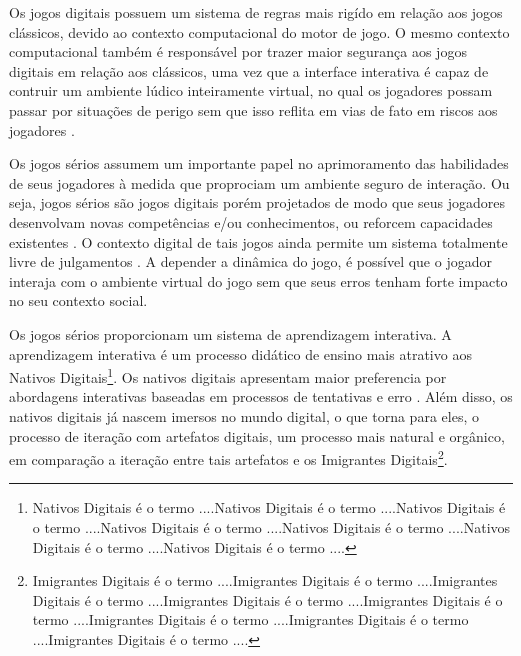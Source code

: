 \vspace{-0,1cm}

Os jogos digitais possuem um sistema de regras mais rigído em relação aos jogos clássicos, devido ao contexto computacional do motor de jogo. O mesmo contexto computacional também é responsável por trazer maior segurança aos jogos digitais em relação aos clássicos, uma vez que a interface interativa é capaz de contruir um ambiente lúdico inteiramente virtual, no qual os jogadores possam passar por situações de perigo sem que isso reflita em vias de fato em riscos aos jogadores \cite{lucchese2009conceituaccao}.



Os jogos sérios assumem um importante papel no aprimoramento das habilidades de seus jogadores à medida que proprociam um ambiente seguro de interação. Ou seja, jogos sérios são jogos digitais porém projetados de modo que seus jogadores desenvolvam novas competências e/ou conhecimentos, ou reforcem capacidades existentes \cite{boller2017play}. O contexto digital de tais jogos ainda permite um sistema totalmente livre de julgamentos \cite{women2018international}. A depender a dinâmica do jogo, é possível que o jogador interaja com o ambiente virtual do jogo sem que seus erros tenham forte impacto no seu contexto social.

Os jogos sérios proporcionam um sistema de aprendizagem interativa. A aprendizagem interativa é um processo didático de ensino mais atrativo aos Nativos Digitais\footnote{Nativos Digitais é o termo ....Nativos Digitais é o termo ....Nativos Digitais é o termo ....Nativos Digitais é o termo ....Nativos Digitais é o termo ....Nativos Digitais é o termo ....Nativos Digitais é o termo ....}. Os nativos digitais apresentam maior preferencia por abordagens interativas baseadas em processos de tentativas e erro \cite{pescador2010tecnologias}. Além disso, os nativos digitais já nascem imersos no mundo digital, o que torna para eles, o processo de iteração com artefatos digitais, um processo mais natural e orgânico, em comparação a iteração entre tais artefatos e os Imigrantes Digitais\footnote{Imigrantes Digitais é o termo ....Imigrantes Digitais é o termo ....Imigrantes Digitais é o termo ....Imigrantes Digitais é o termo ....Imigrantes Digitais é o termo ....Imigrantes Digitais é o termo ....Imigrantes Digitais é o termo ....Imigrantes Digitais é o termo ....}.

